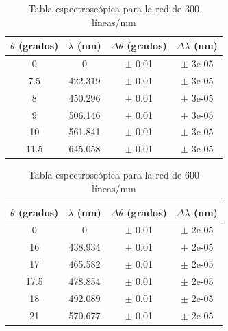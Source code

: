 \documentclass[11pt, a4paper, twocolumn]{article}
\begin{document}
\vspace{0.5cm}
\begin{table}[H]
    \caption{Tabla espectroscópica para la red de 300 líneas/mm}
    \centering
    \small
    \setlength{\tabcolsep}{4pt}
    \begin{tabular}{cccc}
        \hline
        $\theta$ (grados) &   $\lambda$ (nm) & $\Delta \theta$ (grados)   & $\Delta \lambda$ (nm)   \\
        \hline
                        0   &            0     & $\pm$ 0.01                     & $\pm$ 3e-05                 \\
                        7.5 &          422.319 & $\pm$ 0.01                     & $\pm$ 3e-05                 \\
                        8   &          450.296 & $\pm$ 0.01                     & $\pm$ 3e-05                 \\
                        9   &          506.146 & $\pm$ 0.01                     & $\pm$ 3e-05                 \\
                        10   &          561.841 & $\pm$ 0.01                     & $\pm$ 3e-05                 \\
                        11.5 &          645.058 & $\pm$ 0.01                     & $\pm$ 3e-05                 \\
        \hline
    \end{tabular}
    
\end{table}

\vspace{0.5cm}

\begin{table}[H]
    \caption{Tabla espectroscópica para la red de 600 líneas/mm}
    \centering
    \small
    \setlength{\tabcolsep}{4pt}
    \begin{tabular}{cccc}
        \hline
        $\theta$ (grados) &   $\lambda$ (nm) & $\Delta \theta$ (grados)   & $\Delta \lambda$ (nm)   \\
        \hline
                        0   &            0     & $\pm$ 0.01                     & $\pm$ 2e-05                 \\
                        16   &          438.934 & $\pm$ 0.01                     & $\pm$ 2e-05                 \\
                        17   &          465.582 & $\pm$ 0.01                     & $\pm$ 2e-05                 \\
                        17.5 &          478.854 & $\pm$ 0.01                     & $\pm$ 2e-05                 \\
                        18   &          492.089 & $\pm$ 0.01                     & $\pm$ 2e-05                 \\
                        21   &          570.677 & $\pm$ 0.01                     & $\pm$ 2e-05                 \\
        \hline
    \end{tabular}
\end{table}
\end{document}
